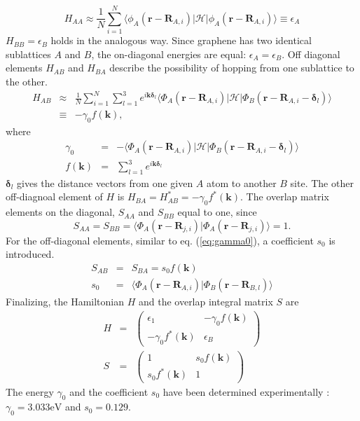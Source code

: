 \begin{equation}
H_{A A} \approx \frac{1}{N} \sum_{i=1}^N \langle \phi_A ( \mathbf{r} - \mathbf{R}_{A, i} ) | \mathcal{H} |  \phi_A ( \mathbf{r} - \mathbf{R}_{A, i} ) \rangle \equiv \epsilon_A
\end{equation}
$H_{B B} = \epsilon_B$ holds in the analogous way. Since graphene has two identical sublattices $A$ and $B$, the on-diagonal energies are equal: $\epsilon_A = \epsilon_B$. 
Off diagonal elements $H_{A B}$ and $H_{B A}$ describe the possibility of hopping from one sublattice to the other. 
\begin{eqnarray}
H_{A B } &\approx & \frac{1}{N} \sum_{i = 1}^N \sum_{l = 1}^3 e^{i \mathbf{k} \bm{\delta}_l} \langle \Phi_A ( \mathbf{r} - \mathbf{R}_{A, i} ) | \mathcal{H} | \Phi_B ( \mathbf{r} - \mathbf{R}_{A, i} - \bm{\delta}_l ) \rangle  \\
& \equiv & - \gamma_0 f \left( \mathbf{k} \right) \label{eq:gamma0},
\end{eqnarray}
where
\begin{eqnarray}
\gamma_0 &=& - \langle \Phi_A ( \mathbf{r} - \mathbf{R}_{A, i} )| \mathcal{H} | \Phi_B ( \mathbf{r} - \mathbf{R}_{A, i} - \bm{\delta}_l ) \rangle \\
f \left( \mathbf{k} \right) &=&  \sum_{l = 1}^3 e^{i \mathbf{k} \bm{\delta}_l} 
\end{eqnarray}
$\bm{\delta}_l$ gives the distance vectors from one given $A$ atom to another $B$ site. The other off-diagnoal element of $H$ is $H_{B A} = H_{A B}^* = - \gamma_0 f^* \left( \mathbf{k} \right)$. The overlap matrix elements on the diagonal, $S_{A A}$ and $S_{B B}$ equal to one, since 
\begin{equation}
S_{A A} = S_{B B} = \langle \Phi_A ( \mathbf{r} - \mathbf{R}_{j, i} ) | \Phi_A ( \mathbf{r} - \mathbf{R}_{j, i} ) \rangle = 1.
\end{equation}
For the off-diagonal elements, similar to eq. (\ref{eq:gamma0}), a coefficient $s_0$ is introduced.
\begin{eqnarray}
S_{A B} &=& S_{B A} = s_0 f \left( \mathbf{k} \right) \\
s_0 &=& \langle \Phi_A ( \mathbf{r} - \mathbf{R}_{A, i} ) | \Phi_B ( \mathbf{r} - \mathbf{R}_{B, l} ) \rangle 
\end{eqnarray}
Finalizing, the Hamiltonian $H$ and the overlap integral matrix $S$ are
\begin{eqnarray}
H &=& \begin{pmatrix} \epsilon_1 & - \gamma_0 f \left( \mathbf{k} \right) \\ - \gamma_0 f^* \left( \mathbf{k} \right) & \epsilon_B \end{pmatrix} \\
S &=& \begin{pmatrix} 1 & s_0 f \left( \mathbf{k} \right) \\ s_0 f^* \left( \mathbf{k} \right) & 1 \end{pmatrix}
\end{eqnarray}
The energy $\gamma_0$ and the coefficient $s_0$ have been determined experimentally \cite{Dresselhaus1995}:
$\gamma_0 = 3.033 \text{eV}$ and $s_0 = 0.129$.

